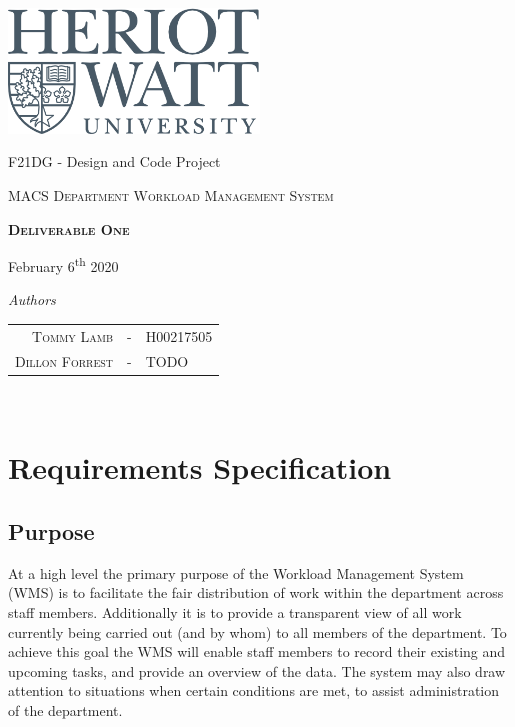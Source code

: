 \documentclass[11pt, a4paper]{article}
\begin{document}
\begin{titlepage}
	\thispagestyle{empty}
	{\centering
		\includegraphics[width=0.5\textwidth]{heriot-watt-logo.png}\par\vspace{1cm}
		\vspace{1cm}
		{\LARGE F21DG - Design and Code Project\par}
		{\LARGE \par}
		\vspace{1.5cm}
		{\scshape\Large MACS Department Workload Management System\par}
		\vspace{1.5cm}
		{\scshape\LARGE\bfseries Deliverable One \par}

		\vspace{3.5cm}
			\begin{center}
					February 6\textsuperscript{th} 2020
			\end{center}
		\textit{Authors}\par
		\begin{tabular}{rcl}
			\\ \textsc{Tommy Lamb} & - & H00217505\\
			\textsc{Dillon Forrest} & - & TODO\\
		\end{tabular} \\
	
	}
\end{titlepage}

\section{Requirements Specification}

\subsection{Purpose}
At a high level the primary purpose of the Workload Management System (WMS) is to facilitate the fair distribution of work within the department across staff members. Additionally it is to provide a transparent view of all work currently being carried out (and by whom) to all members of the department. To achieve this goal the WMS will enable staff members to record their existing and upcoming tasks, and provide an overview of the data. The system may also draw attention to situations when certain conditions are met, to assist administration of the department.
\end{document}
